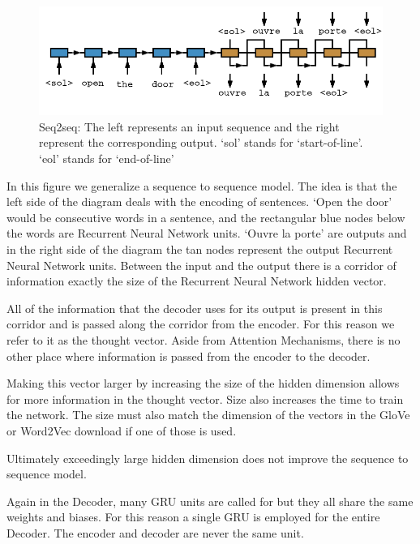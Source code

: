 \begin{figure}[H]
	\begin{center}
	
	\includegraphics[scale=2]{diagram-nmt03}
		
\end{center}
	\caption[Sequence to Sequence Architecture]{Seq2seq: The left represents an input sequence and the right represent the corresponding output. `sol' stands for `start-of-line'. `eol' stands for `end-of-line'}
	

\end{figure}

In this figure we generalize a sequence to sequence model. The idea is that the left side of the diagram deals with the encoding of sentences. `Open the door' would be consecutive words in a sentence, and the rectangular blue nodes below the words are Recurrent Neural Network units. `Ouvre la porte' are outputs and in the right side of the diagram the tan nodes represent the output Recurrent Neural Network units. Between the input and the output there is a corridor of information exactly the size of the Recurrent Neural Network hidden vector. 

All of the information that the decoder uses for its output is present in this corridor and is passed along the corridor from the encoder. For this reason we refer to it as the thought vector. Aside from Attention Mechanisms, there is no other place where information is passed from the encoder to the decoder.

Making this vector larger by increasing the size of the hidden dimension allows for more information in the thought vector. Size also increases the time to train the network. The size must also match the dimension of the vectors in the GloVe or Word2Vec download if one of those is used. 

Ultimately exceedingly large hidden dimension does not improve the sequence to sequence model.

Again in the Decoder, many GRU units are called for but they all share the same weights and biases. For this reason a single GRU is employed for the entire Decoder. The encoder and decoder are never the same unit.

